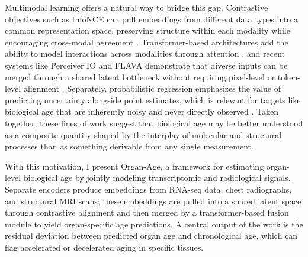 \documentclass[10pt,twocolumn]{article}
\begin{document}
Multimodal learning offers a natural way to bridge this gap. Contrastive objectives such as
InfoNCE can pull embeddings from different data types into a common representation space,
preserving structure within each modality while encouraging cross-modal agreement
\cite{oord2018cpc,chen2020simclr,radford2021clip}. Transformer-based architectures add the
ability to model interactions across modalities through attention \cite{vaswani2017}, and recent
systems like Perceiver IO and FLAVA demonstrate that diverse inputs can be merged through a
shared latent bottleneck without requiring pixel-level or token-level alignment
\cite{jaegle2021perceiver,singh2021flava}. Separately, probabilistic regression emphasizes the
value of predicting uncertainty alongside point estimates, which is relevant for targets like
biological age that are inherently noisy and never directly observed \cite{kendall2017}. Taken
together, these lines of work suggest that biological age may be better understood as a composite
quantity shaped by the interplay of molecular and structural processes than as something derivable
from any single measurement.

With this motivation, I present Organ-Age, a framework for estimating organ-level biological age
by jointly modeling transcriptomic and radiological signals. Separate encoders produce embeddings
from RNA-seq data, chest radiographs, and structural MRI scans; these embeddings are pulled into
a shared latent space through contrastive alignment and then merged by a transformer-based fusion
module to yield organ-specific age predictions. A central output of the work is the residual
deviation between predicted organ age and chronological age, which can flag accelerated or
decelerated aging in specific tissues.
\end{document}
